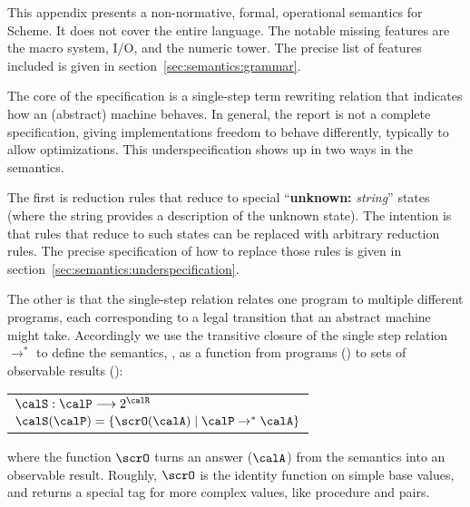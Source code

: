 

This appendix presents a non-normative, formal, operational semantics for Scheme. It does not cover the entire language. The notable missing features are the macro system, I/O, and the numeric tower. The precise list of features included is given in section~\ref{sec:semantics:grammar}.

The core of the specification is a single-step term rewriting relation that indicates how an (abstract) machine behaves. In general, the report is not a complete specification, giving implementations freedom to behave differently, typically to allow optimizations. This underspecification shows up in two ways in the semantics. 

The first is reduction rules that reduce to special ``\textbf{unknown:} \textit{string}'' states (where the string provides a description of the unknown state). The intention is that rules that reduce to such states can be replaced with arbitrary reduction rules. The precise specification of how to replace those rules is given in section~\ref{sec:semantics:underspecification}.

The other is that the single-step relation relates one program to
multiple different programs, each corresponding to a legal transition
that an abstract machine might take. Accordingly we use the transitive
closure of the single step relation $\rightarrow^*$ to define the
semantics, \calS, as a function from programs (\calP)
to sets of observable results (\calR):
\begin{center}
\begin{tabular}{l}
$\calS : \calP \longrightarrow 2^{\calR}$ \\
$\calS(\calP) = \{ \scrO(\calA) \mid \calP \rightarrow^* \calA \}$
\end{tabular}
\end{center}
where the function $\scrO$ turns an answer ($\calA$) from the semantics into an observable result. Roughly, $\scrO$ is the identity function on simple base values, and returns a special tag for more complex values, like procedure and pairs.

